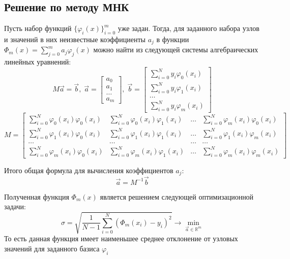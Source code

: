 	\subsection{Решение по методу МНК}
	
	Пусть набор функций $\{\varphi_i(x)\}_{i=0}^m$ уже задан. Тогда, для заданного набора узлов и значений в них неизвестные коэффициенты $a_j$ в функции $\Phi_m(x) = \sum_{j=0}^m a_j\varphi_j(x)$ можно найти из следующей системы алгебраических линейных уравнений:
	\begin{equation*}
		M\vec{a} = \vec{b},\; \vec{a} = \begin{bmatrix*}
			a_0 \\ a_1 \\ \dots \\ a_m
		\end{bmatrix*},\; \vec{b} = \begin{bmatrix*}
			\sum_{i=0}^N y_i\varphi_0(x_i) \\ \sum_{i=0}^N y_i\varphi_1(x_i) \\ \dots \\ \sum_{i=0}^N y_i\varphi_m(x_i)
	\end{bmatrix*}
	\end{equation*}
	\begin{equation*}
		M = \begin{bmatrix*}
			\sum_{i=0}^N \varphi_0(x_i)\varphi_0(x_i) & \sum_{i=0}^N \varphi_0(x_i)\varphi_1(x_i) & \dots & \sum_{i=0}^N \varphi_m(x_i)\varphi_0(x_i) \\ 
			\sum_{i=0}^N \varphi_1(x_i)\varphi_0(x_i) & \sum_{i=0}^N \varphi_1(x_i)\varphi_1(x_i) & \dots & \sum_{i=0}^N \varphi_1(x_i)\varphi_m(x_i) \\
			\dots & \dots & \dots & \dots \\
			\sum_{i=0}^N \varphi_m(x_i)\varphi_0(x_i) & \sum_{i=0}^N \varphi_m(x_i)\varphi_1(x_i) & \dots & \sum_{i=0}^N \varphi_m(x_i)\varphi_m(x_i)
		\end{bmatrix*}
	\end{equation*}

	Итого общая формула для вычисления коэффициентов $a_j$:
	\begin{equation*}
		\vec{a} = M^{-1}\vec{b}
	\end{equation*}

	Полученная функция $\Phi_m(x)$ является решением следующей оптимизационной задачи:
	\begin{equation*}
		\sigma = \sqrt{\frac{1}{N-1}\sum_{i=0}^N \left(\Phi_m(x_i)-y_i\right)^2} \to \min_{\vec{a}\in\mathbb{R}^m}
	\end{equation*}
	То есть данная функция имеет наименьшее среднее отклонение от узловых значений для заданного базиса $\varphi_i$
	
